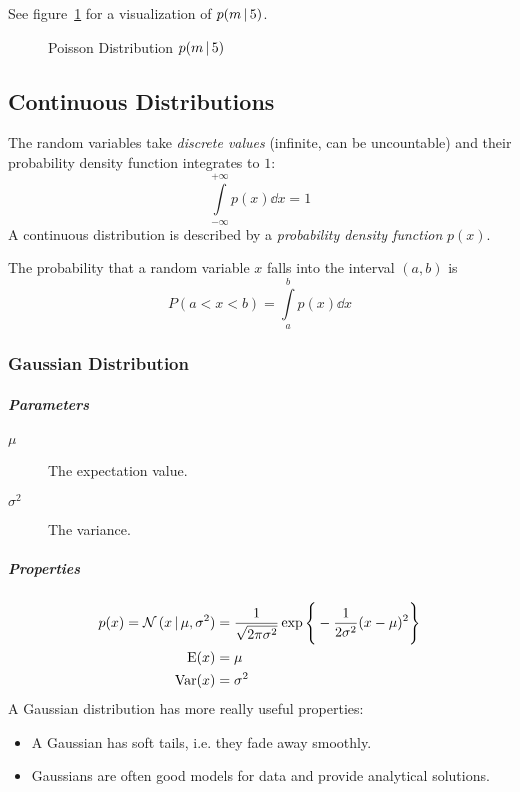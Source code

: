 				See figure~\ref{fig:poissonDistribution} for a visualization of \( p(m \,\vert\, 5) \).

				\begin{figure}
					\centering
					\caption{Poisson Distribution \( p(m \,\vert\, 5) \)}
					\label{fig:poissonDistribution}
				\end{figure}

		\subsection{Continuous Distributions}
			The random variables take \emph{discrete values} (infinite, can be uncountable) and their probability density function integrates to \(1\):
			\begin{equation}
				\int\limits_{-\infty}^{+\infty} p(x) \dd{x} = 1
			\end{equation}
			A continuous distribution is described by a \emph{probability density function} \(p(x)\).

			The probability that a random variable \( x \) falls into the interval \( (a, b) \) is
			\begin{equation}
				P(a < x < b) = \int\limits_a^b p(x) \dd{x}
			\end{equation}

			\subsubsection{Gaussian Distribution}
				\subparagraph{Parameters}
				\begin{description}
					\item[\(\mu\)] The expectation value.
					\item[\(\sigma^2\)] The variance.
				\end{description}

				\subparagraph{Properties}
				\begin{align}
					p(x) = \mathcal{N}\,(x \,\vert\, \mu, \sigma^2) &= \frac{1}{\sqrt{2\pi\sigma^2}} \exp\Bigg\{ -\frac{1}{2\sigma^2} (x - \mu)^2 \Bigg\} \\
					\operatorname{E}(x) &= \mu \\
					\operatorname{Var}(x) &= \sigma^2
				\end{align}
				A Gaussian distribution has more really useful properties:
				\begin{itemize}
					\item A Gaussian has soft tails, i.e. they fade away smoothly.
					\item Gaussians are often good models for data and provide analytical solutions.
				\end{itemize}


